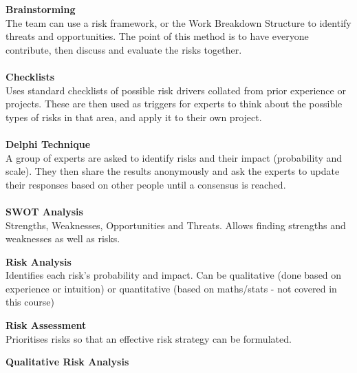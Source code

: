 \documentclass[a4paper,10pt]{article}
\begin{document}
\textbf{Brainstorming}\\
The team can use a risk framework, or the Work Breakdown Structure to identify threats and opportunities. The point of this method is to have everyone contribute, then discuss and evaluate the risks together. \\\\
\textbf{Checklists}\\
Uses standard checklists of possible risk drivers collated from prior experience or projects. These are then used as triggers for experts to think about the possible types of risks in that area, and apply it to their own project. \\\\
\textbf{Delphi Technique} \\
A group of experts are asked to identify risks and their impact (probability and scale). They then share the results anonymously and ask the experts to update their responses based on other people until a consensus is reached. \\\\
\textbf{SWOT Analysis} \\
Strengths, Weaknesses, Opportunities and Threats. Allows finding strengths and weaknesses as well as risks.
\begin{shaded}
	\noindent \textcolor{BlueGreen}{\textbf{Risk Analysis}} \\
	Identifies each risk's probability and impact. Can be qualitative (done based on experience or intuition) or quantitative (based on maths/stats - not covered in this course)
\end{shaded}
\begin{shaded}
	\noindent \textcolor{BlueGreen}{\textbf{Risk Assessment}} \\
	Prioritises risks so that an effective risk strategy can be formulated. 
\end{shaded}
\newpage
\noindent \textcolor{BlueGreen}{\textbf{Qualitative Risk Analysis}}
\end{document}
